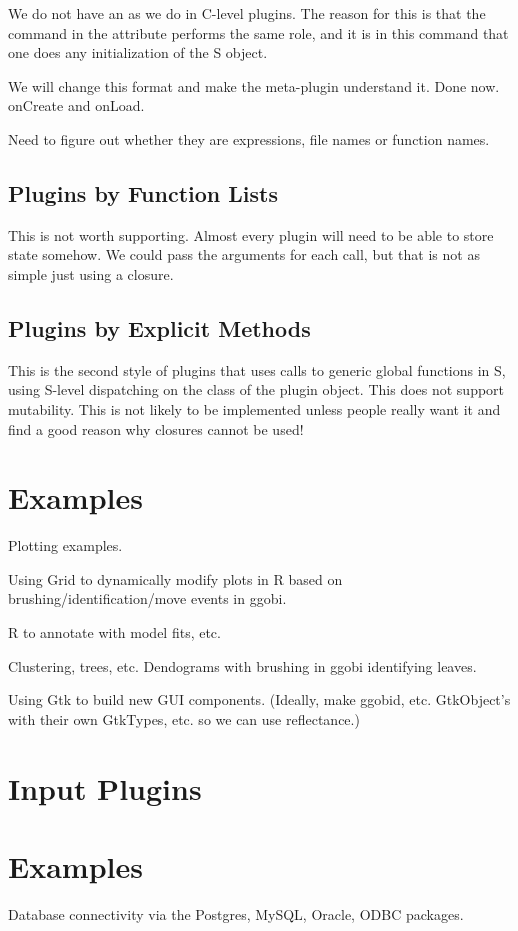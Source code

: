 \documentclass{article}
\begin{document}
We do not have an  as we do in C-level plugins.
The reason for this is that the command in the 
attribute performs the same role, and it is in this command that one
does any initialization of the S object.


We will change this format and make the meta-plugin understand it.
Done now. onCreate and onLoad.

Need to figure out whether they are expressions, file names or
function names.


\subsection{Plugins by Function Lists}
This is not worth supporting.  Almost every plugin will need to be
able to store state somehow.  We could pass the arguments for each
call, but that is not as simple just using a closure.

\subsection{Plugins by Explicit Methods}
This is the second style of plugins that uses calls to generic global
functions in S, using S-level dispatching on the class of the plugin
object.  This does not support mutability.  This is not likely to be
implemented unless people really want it and find a good reason
why closures cannot be used! 

\section{Examples}
Plotting examples.

Using Grid to dynamically modify plots in R based on
brushing/identification/move events in ggobi.

R to annotate with model fits, etc.

Clustering, trees, etc. Dendograms with brushing in ggobi identifying
leaves.

Using Gtk to build new GUI components.  (Ideally, make ggobid, etc.
GtkObject's with their own GtkTypes, etc. so we can use reflectance.)


\section{Input Plugins}


\section{Examples}
Database connectivity via the Postgres, MySQL, Oracle, ODBC packages.
\end{document}
